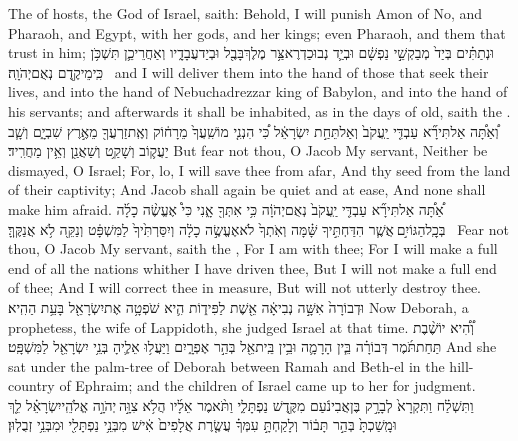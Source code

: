 {The \lord\space of hosts, the God of Israel, saith: Behold, I will punish Amon of No, and Pharaoh, and Egypt, with her gods, and her kings; even Pharaoh, and them that trust in him;}
{וּנְתַתִּ֗ים בְּיַד֙ מְבַקְשֵׁ֣י נַפְשָׁ֔ם וּבְיַ֛ד נְבוּכַדְרֶאצַּ֥ר מֶלֶךְ\maqqaf בָּבֶ֖ל וּבְיַד\maqqaf עֲבָדָ֑יו וְאַחֲרֵי\maqqaf כֵ֛ן תִּשְׁכֹּ֥ן כִּֽימֵי\maqqaf קֶ֖דֶם נְאֻם\maqqaf יְהֹוָֽה׃ \petucha }
{and I will deliver them into the hand of those that seek their lives, and into the hand of Nebuchadrezzar king of Babylon, and into the hand of his servants; and afterwards it shall be inhabited, as in the days of old, saith the \lord.}
{וְ֠אַתָּ֠ה אַל\maqqaf תִּירָ֞א עַבְדִּ֤י יַֽעֲקֹב֙ וְאַל\maqqaf תֵּחַ֣ת יִשְׂרָאֵ֔ל כִּ֠י הִנְנִ֤י מוֹשִֽׁעֲךָ֙ מֵרָח֔וֹק וְאֶֽת\maqqaf זַרְעֲךָ֖ מֵאֶ֣רֶץ שִׁבְיָ֑ם וְשָׁ֧ב יַעֲק֛וֹב וְשָׁקַ֥ט וְשַׁאֲנַ֖ן וְאֵ֥ין מַחֲרִֽיד׃}
{But fear not thou, O Jacob My servant, Neither be dismayed, O Israel; For, lo, I will save thee from afar, And thy seed from the land of their captivity; And Jacob shall again be quiet and at ease, And none shall make him afraid.}
{אַ֠תָּ֠ה אַל\maqqaf תִּירָ֞א עַבְדִּ֤י יַֽעֲקֹב֙ נְאֻם\maqqaf יְהֹוָ֔ה כִּ֥י אִתְּךָ֖ אָ֑נִי כִּי֩ אֶעֱשֶׂ֨ה כָלָ֜ה בְּכׇֽל\maqqaf הַגּוֹיִ֣ם \legarmeh  אֲשֶׁ֧ר הִדַּחְתִּ֣יךָ שָּׁ֗מָּה וְאֹֽתְךָ֙ לֹא\maqqaf אֶעֱשֶׂ֣ה כָלָ֔ה וְיִסַּרְתִּ֙יךָ֙ לַמִּשְׁפָּ֔ט וְנַקֵּ֖ה לֹ֥א אֲנַקֶּֽךָּ׃ \petucha }
{Fear not thou, O Jacob My servant, saith the \lord, For I am with thee; For I will make a full end of all the nations whither I have driven thee, But I will not make a full end of thee; And I will correct thee in measure, But will not utterly destroy thee.}
\label{haft_16}
\setcounter{chap}{4}
\setcounter{verse}{4}
{וּדְבוֹרָה֙ אִשָּׁ֣ה נְבִיאָ֔ה אֵ֖שֶׁת לַפִּיד֑וֹת הִ֛יא שֹׁפְטָ֥ה אֶת\maqqaf יִשְׂרָאֵ֖ל בָּעֵ֥ת הַהִֽיא׃}
{Now Deborah, a prophetess, the wife of Lappidoth, she judged Israel at that time.}
{וְ֠הִ֠יא יוֹשֶׁ֨בֶת תַּחַת\maqqaf תֹּ֜מֶר דְּבוֹרָ֗ה בֵּ֧ין הָרָמָ֛ה וּבֵ֥ין בֵּֽית\maqqaf אֵ֖ל בְּהַ֣ר אֶפְרָ֑יִם וַיַּעֲל֥וּ אֵלֶ֛יהָ בְּנֵ֥י יִשְׂרָאֵ֖ל לַמִּשְׁפָּֽט׃}
{And she sat under the palm-tree of Deborah between Ramah and Beth-el in the hill-country of Ephraim; and the children of Israel came up to her for judgment.}
{וַתִּשְׁלַ֗ח וַתִּקְרָא֙ לְבָרָ֣ק בֶּן\maqqaf אֲבִינֹ֔עַם מִקֶּ֖דֶשׁ נַפְתָּלִ֑י וַתֹּ֨אמֶר אֵלָ֜יו הֲלֹ֥א צִוָּ֣ה \legarmeh  יְהֹוָ֣ה אֱלֹהֵֽי\maqqaf יִשְׂרָאֵ֗ל לֵ֤ךְ וּמָֽשַׁכְתָּ֙ בְּהַ֣ר תָּב֔וֹר וְלָקַחְתָּ֣ עִמְּךָ֗ עֲשֶׂ֤רֶת אֲלָפִים֙ אִ֔ישׁ מִבְּנֵ֥י נַפְתָּלִ֖י וּמִבְּנֵ֥י זְבֻלֽוּן׃}
